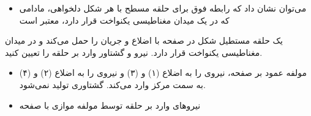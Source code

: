 \begin{ELjoin}

\begin{itemize}
\tightlist
\item
  می‌توان نشان داد که رابطه فوق برای حلقه مسطح با هر شکل دلخواهی، مادامی که در یک میدان مغناطیسی یکنواخت قرار دارد، معتبر است
\end{itemize}


\begin{ELexample}{}

یک حلقه مستطیل شکل در صفحه  با اضلاع  و  جریان  را حمل می‌کند و در میدان مغناطیسی یکنواخت  قرار دارد. نیرو و گشتاور وارد بر حلقه را تعیین کنید.


\begin{ELsolution}


\begin{itemize}
\tightlist
\item
  مولفه عمود بر صفحه، نیروی  را به اضلاع (۱) و (۳) و نیروی  را به اضلاع (۲) و (۴) به سمت مرکز وارد می‌کند. \ELim{\ELto} گشتاوری تولید نمی‌شود.
\item
  نیروهای وارد بر حلقه توسط مولفه موازی با صفحه
\end{itemize}



\end{ELsolution}

\end{ELexample}

\end{ELjoin}

